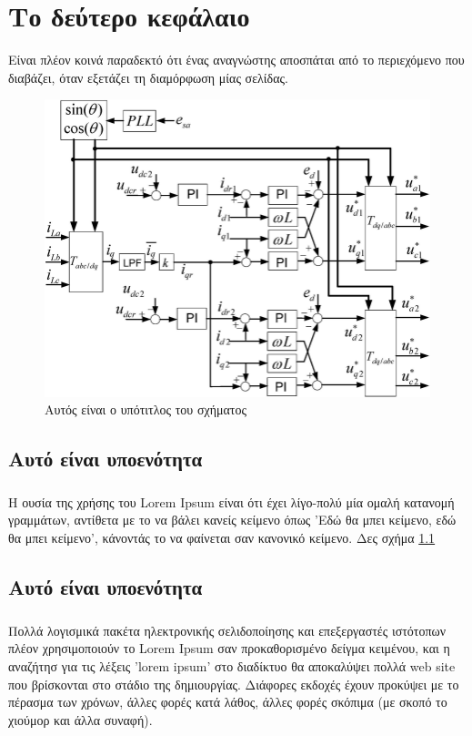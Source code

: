 \chapter{Το δεύτερο κεφάλαιο}
    Είναι πλέον κοινά παραδεκτό ότι ένας αναγνώστης αποσπάται από το περιεχόμενο που διαβάζει, όταν εξετάζει τη διαμόρφωση
    μίας σελίδας.

    \begin{figure}[h!]
        \centering
        \includegraphics[scale=0.3]{assets/figures/figure_1.png}
        \caption{Αυτός είναι ο υπότιτλος του σχήματος}
        \label{fig:figure of something}
    \end{figure}

    \section{Αυτό είναι υποενότητα}
    \paragraph{}
    Η ουσία της χρήσης του Lorem Ipsum είναι ότι έχει λίγο-πολύ μία ομαλή κατανομή γραμμάτων, αντίθετα με το
    να βάλει κανείς κείμενο όπως 'Εδώ θα μπει κείμενο, εδώ θα μπει κείμενο', κάνοντάς το να φαίνεται σαν κανονικό κείμενο.
    Δες σχήμα \ref{fig:figure of something}

    \section{Αυτό είναι υποενότητα}
    \paragraph{}
    Πολλά λογισμικά πακέτα ηλεκτρονικής σελιδοποίησης και επεξεργαστές ιστότοπων πλέον χρησιμοποιούν το Lorem Ipsum σαν
    προκαθορισμένο δείγμα κειμένου, και η αναζήτησ για τις λέξεις 'lorem ipsum' στο διαδίκτυο θα αποκαλύψει πολλά web site
    που βρίσκονται στο στάδιο της δημιουργίας. Διάφορες εκδοχές έχουν προκύψει με το πέρασμα των χρόνων, άλλες φορές κατά
    λάθος, άλλες φορές σκόπιμα (με σκοπό το χιούμορ και άλλα συναφή).

